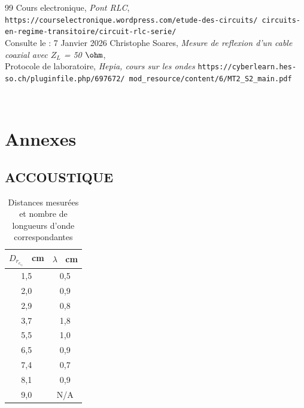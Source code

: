 \begin{thebibliography}{99}
Cours electronique, \textit{Pont RLC},
\\
                \texttt{https://courselectronique.wordpress.com/etude-des-circuits/
                circuits-en-regime-transitoire/circuit-rlc-serie/}
\\
        Consulte le : 7 Janvier 2026
Christophe Soares, \textit{Mesure de reflexion d'un cable coaxial avec $Z_L$ = 50 $\ohm$},
        \\
                Protocole de laboratoire, \textit{Hepia, cours sur les ondes}
                \texttt{https://cyberlearn.hes-so.ch/pluginfile.php/697672/
                                mod\_resource/content/6/MT2\_S2\_main.pdf}

        \\

\end{thebibliography}

\newpage

\section{Annexes}

\subsection{ACCOUSTIQUE}

\begin{table}[h!]
\centering
\begin{tabular}{|c|c|}
\hline
	$D_r_e_e_l$ \ cm &
	$\lambda$ \ cm  & \\
\hline
1,5 & 0,5 \\
2,0 & 0,9 \\
2,9 & 0,8 \\
3,7 & 1,8 \\
5,5 & 1,0 \\
6,5 & 0,9 \\
7,4 & 0,7 \\
8,1 & 0,9 \\
9,0 & N/A \\
\hline
\end{tabular}
\caption{Distances mesurées et nombre de longueurs d’onde correspondantes}
        \label{tab:lambda}
\end{table}


